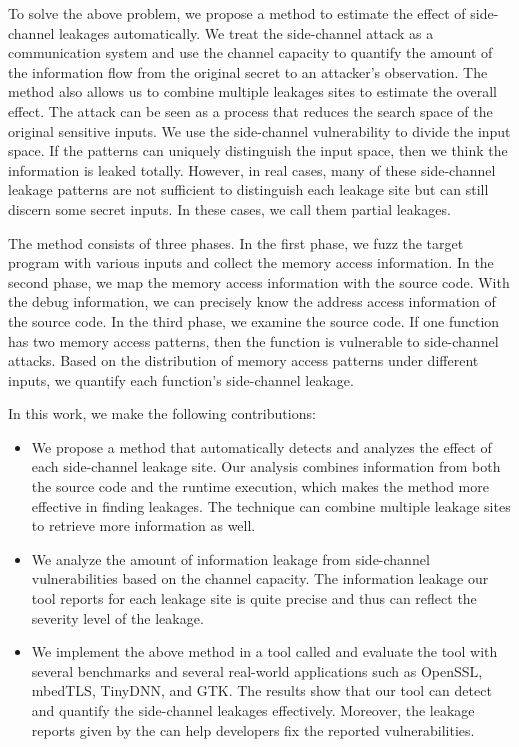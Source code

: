 To solve the above problem, we propose a method to estimate the effect of side-channel leakages automatically. We treat the side-channel attack as a communication system and use the channel capacity to quantify the amount of the information flow from the original secret to an attacker's observation. The method also allows us to combine multiple leakages sites to estimate the overall effect. The attack can be seen as a process that reduces the search space of the original sensitive inputs. We use the side-channel vulnerability to divide the input space. If the patterns can uniquely distinguish the input space, then we think the information is leaked totally. However, in real cases, many of these side-channel leakage patterns are not sufficient to distinguish each leakage site but can still discern some secret inputs. In these cases, we call them partial leakages.

The method consists of three phases. In the first phase, we fuzz the target program with various inputs and collect the memory access information. In the second phase, we map the memory access information with the source code. With the debug information, we can precisely know the address access information of the source code. In the third phase, we examine the source code. If one function has two memory access patterns, then the function is vulnerable to side-channel attacks. Based on the distribution of memory access patterns under different inputs, we quantify each function's side-channel leakage.

In this work, we make the following contributions:

\begin{itemize}

  \item We propose a method that automatically detects and analyzes the
  effect of each side-channel leakage site. Our analysis combines
  information from both the source code and the runtime execution,
  which makes the method more effective in finding leakages. The
  technique can combine multiple leakage sites to retrieve more
  information as well.

  \item We analyze the amount of information leakage from side-channel
  vulnerabilities based on the channel capacity.   The
  information leakage our tool reports for each leakage
  site is quite precise and thus can reflect the severity level of the
  leakage.

  \item We implement the above method in a tool called \ctool{} and
  evaluate the tool with several benchmarks and several real-world
  applications such as OpenSSL, mbedTLS, TinyDNN, and GTK\@. The results
  show that our tool can detect and quantify the side-channel leakages
  effectively. Moreover, the leakage reports given by the \ctool{} can
  help developers fix the reported vulnerabilities.
\end{itemize}

